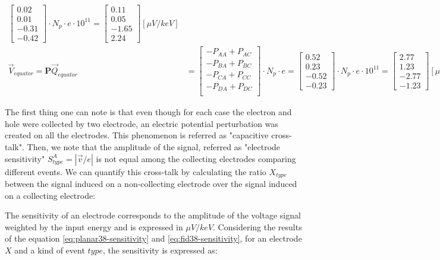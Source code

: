 \begin{align}
\begin{bmatrix}
0.02 \\ 0.01 \\ -0.31 \\ -0.42
\end{bmatrix}
\cdot N_p \cdot e \cdot 10^{11}
= 
\begin{bmatrix}
0.11 \\ 0.05 \\ -1.65 \\ 2.24
\end{bmatrix}
[\mu V/keV]
\\
\vec{V}_{equator} = \bm{P} \vec{Q}_{equator} &=
\begin{bmatrix}
- P_{AA} + P_{AC} \\
- P_{BA} + P_{BC} \\
- P_{CA} + P_{CC} \\
- P_{DA} + P_{DC} \\
\end{bmatrix}
\cdot N_p \cdot e
= 
\begin{bmatrix}
0.52 \\ 0.23 \\ -0.52 \\ -0.23
\end{bmatrix}
\cdot N_p \cdot e \cdot 10^{11}
= 
\begin{bmatrix}
2.77 \\ 1.23 \\ -2.77 \\ -1.23
\end{bmatrix}
[\mu V/keV]
\end{align}

The first thing one can note is that even though for each case the electron and hole were collected by two electrode, an electric potential perturbation was created on all the electrodes. This phenomenon is referred as "capacitive cross-talk". Then, we note that the amplitude of the signal, referred as "electrode sensitivity" $S_{type}^{A} = |\vec{v}/e|$ is not equal among the collecting electrodes comparing different events. We can quantify this cross-talk by calculating the ratio $X_{type}$ between the signal induced on a non-collecting electrode over the signal induced on a collecting electrode:

The sensitivity of an electrode corresponds to the amplitude of the voltage signal weighted by the input energy and is expressed in $\mu V/keV$. Considering the results of the equation \ref{eq:planar38-sensitivity} and \ref{eq:fid38-sensitivity}, for an electrode $X$ and a kind of event $type$, the sensitivity is expressed as:

